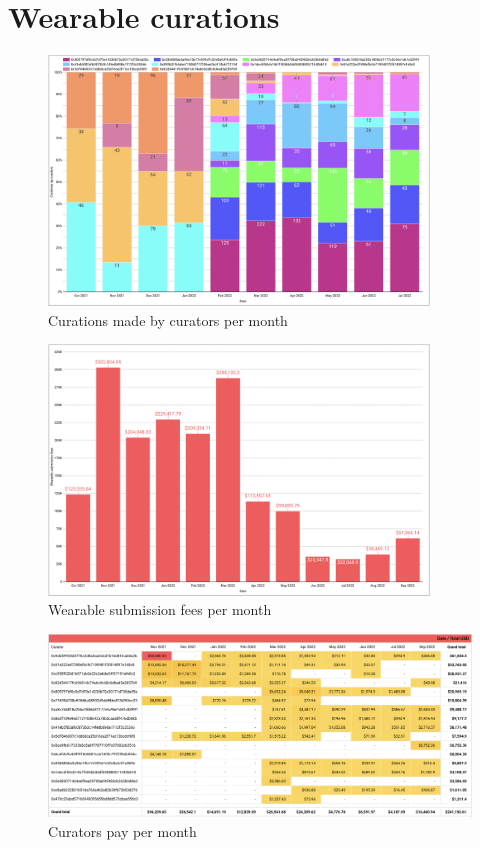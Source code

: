 \documentclass[MSE,Master,english]{twbook}%
\begin{document}
\section{Wearable curations}
\begin{figure}[H]
  \centering
  \includegraphics[width=0.9\textwidth]{metrics/curations.png}
  \caption{Curations made by curators per month}
  \label{fig:curations}
\end{figure}
\begin{figure}[H]
  \centering
  \includegraphics[width=0.9\textwidth]{metrics/submission_fees.png}
  \caption{Wearable submission fees per month}
  \label{fig:submission_fees}
\end{figure}
\begin{figure}[H]
  \centering
  \includegraphics[width=\textwidth]{metrics/curators_pay.png}
  \caption{Curators pay per month}
  \label{fig:curators_pay}
\end{figure}
\end{document}
